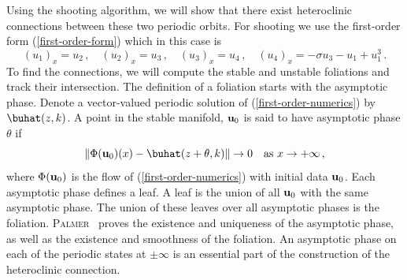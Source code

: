 \documentclass[10pt]{article}
\begin{document}
Using the shooting algorithm, we will show that there exist heteroclinic
connections between these two periodic orbits. For shooting we use the
first-order form (\ref{first-order-form}) which in this case is
%
\begin{equation}\label{first-order-numerics}
  (u_1)_x = u_2\,,\quad (u_2)_x = u_3\,,\quad (u_3)_x = u_4\,,\quad (u_4)_x = - \sigma u_3 - u_1 + u_1^3\,.
\end{equation}
%
To find the connections, we will compute the stable and unstable foliations and track their intersection. The definition of a foliation starts with the asymptotic phase. Denote a vector-valued periodic solution of (\ref{first-order-numerics}) by $\buhat(z,k)$.  A point in the stable manifold, ${\bf u}_0$ is said to have asymptotic phase $\theta$ if
%
\begin{equation}\label{asym-phase-plus}
\|\Phi({\bf u}_0)(x) - \buhat(z+\theta,k)\|\to 0 \quad\mbox{as}\ x\to+\infty\,,
\end{equation}
%
where $\Phi({\bf u}_0)$ is the flow of (\ref{first-order-numerics}) with initial
data ${\bf u}_0$. Each asymptotic phase defines a leaf. A leaf is the union of
all ${\bf u}_0$ with the same asymptotic phase.  The union of these leaves over
all asymptotic phases is the foliation. \textsc{Palmer}~\cite{p00} proves
the existence and uniqueness of the asymptotic phase, as well as the existence and
smoothness of the foliation. An asymptotic phase on each of the periodic
states at $\pm\infty$ is an essential part of the construction of the
heteroclinic connection.  
\end{document}
